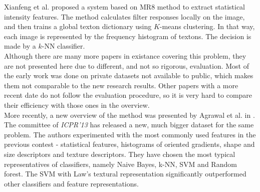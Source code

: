 Xianfeng et al. proposed a system based on MR8 method \cite{Varma2005} to extract statistical intensity features. The method calculates filter responses locally on the image, and then trains a global texton dictionary using $K$-means clustering. In that way, each image is represented by the frequency histogram of textons. The decision is made by a $k$-NN classifier. \\

Although there are many more papers in existance covering this problem, they are not presented here due to different, and not so rigorous, evaluation. Most of the early work was done on private datasets not available to public, which makes them not comparable to the new research results. Other papers with  a more recent date do not follow the evaluation procedure, so it is very hard to compare their efficiency with those ones in the overview. \\

More recently, a new overview of the method was presented by Agrawal et al. in \cite{Agrawal2013}. The committee of \textit{ICPR'13} has released a new, much bigger dataset for the same problem. The authors experimented with the most commonly used features in the previous contest - statistical features, histograms of oriented gradients, shape and size descriptors and texture descriptors. They have chosen the most typical representatives of classifiers, namely Naive Bayes, k-NN, SVM and Random forest. The SVM with Law's textural representation significantly  outperformed other classifiers and feature representations.


